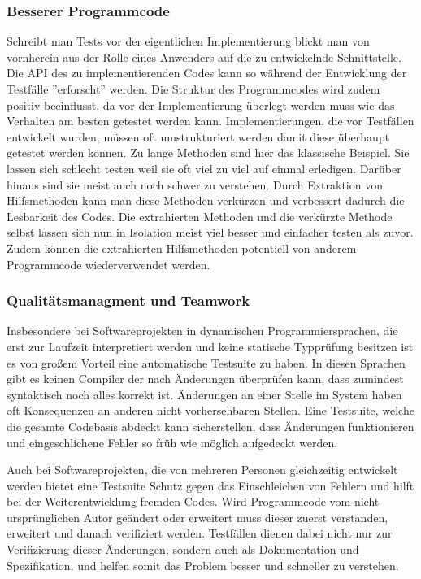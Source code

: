 \subsubsection{Besserer Programmcode}
Schreibt man Tests vor der eigentlichen Implementierung blickt man von
vornherein aus der Rolle eines Anwenders auf die zu entwickelnde
Schnittstelle. Die API des zu implementierenden Codes kann so während
der Entwicklung der Testfälle ''erforscht'' werden. Die Struktur des
Programmcodes wird zudem positiv beeinflusst, da vor der
Implementierung überlegt werden muss wie das Verhalten am besten
getestet werden kann. Implementierungen, die vor Testfällen entwickelt
wurden, müssen oft umstrukturiert werden damit diese überhaupt
getestet werden können. Zu lange Methoden sind hier das klassische
Beispiel. Sie lassen sich schlecht testen weil sie oft viel zu viel
auf einmal erledigen. Darüber hinaus sind sie meist auch noch schwer
zu verstehen. Durch Extraktion von Hilfsmethoden kann man diese
Methoden verkürzen und verbessert dadurch die Lesbarkeit des
Codes. Die extrahierten Methoden und die verkürzte Methode selbst
lassen sich nun in Isolation meist viel besser und einfacher testen
als zuvor. Zudem können die extrahierten Hilfsmethoden potentiell von
anderem Programmcode wiederverwendet werden.

\subsubsection{Qualitätsmanagment und Teamwork}

Insbesondere bei Softwareprojekten in dynamischen Programmiersprachen,
die erst zur Laufzeit interpretiert werden und keine statische
Typprüfung besitzen ist es von großem Vorteil eine automatische
Testsuite zu haben. In diesen Sprachen gibt es keinen Compiler der
nach Änderungen überprüfen kann, dass zumindest syntaktisch noch alles
korrekt ist. Änderungen an einer Stelle im System haben oft
Konsequenzen an anderen nicht vorhersehbaren Stellen. Eine Testsuite,
welche die gesamte Codebasis abdeckt kann sicherstellen, dass
Änderungen funktionieren und eingeschlichene Fehler so früh wie
möglich aufgedeckt werden.

Auch bei Softwareprojekten, die von mehreren Personen gleichzeitig
entwickelt werden bietet eine Testsuite Schutz gegen das Einschleichen
von Fehlern und hilft bei der Weiterentwicklung fremden Codes. Wird
Programmcode vom nicht ursprünglichen Autor geändert oder erweitert
muss dieser zuerst verstanden, erweitert und danach verifiziert
werden. Testfällen dienen dabei nicht nur zur Verifizierung dieser
Änderungen, sondern auch als Dokumentation und Spezifikation, und
helfen somit das Problem besser und schneller zu verstehen.


